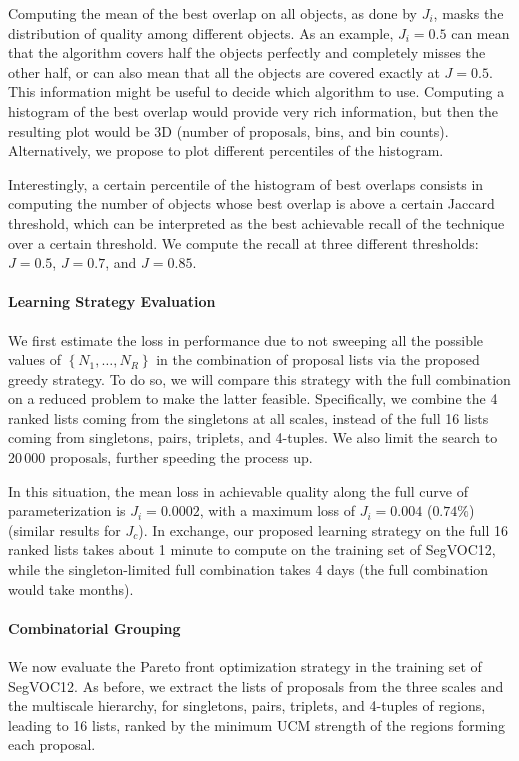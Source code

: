 \documentclass[10pt,journal,cspaper,compsoc]{IEEEtran}
\begin{document}
Computing the mean of the best overlap on all objects, as done by $J_i$, masks the distribution of quality among different objects.
As an example, $J_i\!=\!0.5$ can mean that the algorithm covers half the objects perfectly and completely misses the other half, or
can also mean that all the objects are covered exactly at $J\!=\!0.5$. 
This information might be useful to decide which algorithm to use.
Computing a histogram of the best overlap would provide very rich information, but then the resulting plot would be 3D
(number of proposals, bins, and bin counts).
Alternatively, we propose to plot different percentiles of the histogram.

Interestingly, a certain percentile of the histogram of best overlaps consists in
computing the number of objects whose best overlap is above a certain
Jaccard threshold, which can be interpreted as the best achievable recall of the technique
over a certain threshold.
We compute the recall at three different thresholds: $J\!=\!0.5$, $J\!=\!0.7$, and $J\!=\!0.85$.



\paragraph*{\textbf{Learning Strategy Evaluation}}
We first estimate the loss in performance due to not sweeping all the possible
values of $\left\{N_1,\dots,N_R\right\}$ in the combination of proposal lists via the proposed greedy strategy.
To do so, we will compare this strategy with the full combination on a reduced problem to make
the latter feasible.
Specifically, we combine the 4 ranked lists coming from the singletons at all scales,
instead of the full 16 lists coming from singletons, pairs, triplets, and 4-tuples.
We also limit the search to 20\,000 proposals, further speeding the process up.

In this situation, the mean loss in achievable quality along the full curve of parameterization
is $J_i\!=\!0.0002$, with a maximum loss of $J_i\!=\!0.004$ ($0.74\%$) (similar results for $J_c$).
In exchange, our proposed learning strategy on the full 16 ranked lists takes about 1 minute to compute
on the training set of SegVOC12, while the singleton-limited full combination takes 4 days
(the full combination would take months).

\paragraph*{\textbf{Combinatorial Grouping}}
We now evaluate the Pareto front optimization strategy in the training set of SegVOC12.
As before, we extract the lists of proposals from the three scales and the multiscale hierarchy,
for singletons, pairs, triplets, and 4-tuples of regions, leading to 16 lists, ranked
by the minimum UCM strength of the regions forming each proposal.
\end{document}

